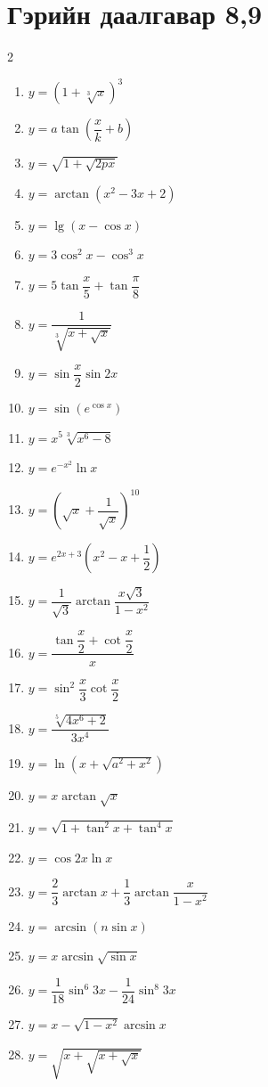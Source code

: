 \section{Гэрийн даалгавар 8,9}
\begin{multicols}{2}
\begin{enumerate}
  \item $y = (1 + \sqrt[3]{x})^3$
  \item $y = a \tan\!\left(\dfrac{x}{k} + b\right)$
  \item $y = \sqrt{1 + \sqrt{2px}}$
  \item $y = \arctan(x^2 - 3x + 2)$
  \item $y = \lg(x - \cos x)$
  \item $y = 3\cos^2 x - \cos^3 x$
  \item $y = 5\tan\dfrac{x}{5} + \tan\dfrac{\pi}{8}$
  \item $y = \dfrac{1}{\sqrt[3]{x + \sqrt{x}}}$
  \item $y = \sin\dfrac{x}{2}\sin2x$
  \item $y = \sin(e^{\cos x})$
  \item $y = x^5\sqrt[3]{x^6 - 8}$
  \item $y = e^{-x^2}\ln x$
  \item $y = \left(\sqrt{x} + \dfrac{1}{\sqrt{x}}\right)^{10}$
  \item $y = e^{2x+3}\!\left(x^2 - x + \dfrac{1}{2}\right)$
  \item $y = \dfrac{1}{\sqrt{3}}\arctan\dfrac{x\sqrt{3}}{1 - x^2}$
  \item $y = \dfrac{\tan\dfrac{x}{2} + \cot\dfrac{x}{2}}{x}$
  \item $y = \sin^2\dfrac{x}{3}\cot\dfrac{x}{2}$
  \item $y = \dfrac{\sqrt[5]{4x^6 + 2}}{3x^4}$
  \item $y = \ln\!\left(x + \sqrt{a^2 + x^2}\right)$
  \item $y = x \arctan\sqrt{x}$
  \item $y = \sqrt{1 + \tan^2 x + \tan^4 x}$
  \item $y = \cos2x\ln x$
  \item $y = \dfrac{2}{3}\arctan x + \dfrac{1}{3}\arctan\dfrac{x}{1 - x^2}$
  \item $y = \arcsin(n\sin x)$
  \item $y = x\arcsin\sqrt{\sin x}$
  \item $y = \dfrac{1}{18}\sin^6 3x - \dfrac{1}{24}\sin^8 3x$
  \item $y = x - \sqrt{1 - x^2}\arcsin x$
  \item $y = \sqrt{x + \sqrt{x + \sqrt{x}}}$

\end{enumerate}
\end{multicols}
